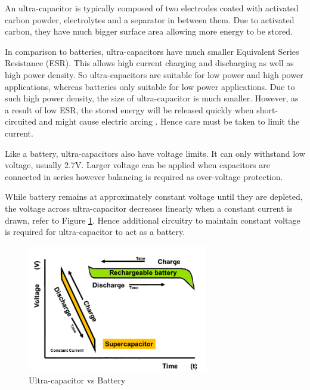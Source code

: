 An ultra-capacitor is typically composed of two electrodes coated with activated carbon powder, electrolytes and a separator in between them. Due to activated carbon, they have much bigger surface area allowing more energy to be stored. 

In comparison to batteries, ultra-capacitors have much smaller Equivalent Series Resistance (ESR). This allows high current charging and discharging as well as high power density. So ultra-capacitors are suitable for low power and high power applications, whereas batteries only suitable for low power applications. Due to such high power density, the size of ultra-capacitor is much smaller. However, as a result of low ESR, the stored energy will be released quickly when short-circuited and might cause electric arcing \cite{murata}. Hence care must be taken to limit the current. 

Like a battery, ultra-capacitors also have voltage limits. It can only withstand low voltage, usually 2.7V. Larger voltage can be applied when capacitors are connected in series however balancing is required as over-voltage protection. 

While battery remains at approximately constant voltage until they are depleted, the voltage across ultra-capacitor decreases linearly when a constant current is drawn, refer to Figure \ref{fig:comparison}. Hence additional circuitry to maintain constant voltage is required for ultra-capacitor to act as a battery. 

\begin{figure}
    \centering
    \includegraphics[width=0.7\textwidth]{figures/ChargeDischarge.png}
    \caption{Ultra-capacitor vs Battery \cite{ultracap_fig}}
    \label{fig:comparison}
\end{figure}

